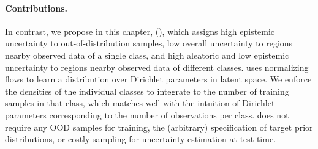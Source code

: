\paragraph{Contributions.} In contrast, we propose  in this chapter, \PostNet (\PostNetacro), which assigns high epistemic uncertainty to out-of-distribution samples, low overall uncertainty to regions nearby observed data of a single class, and high aleatoric and low epistemic uncertainty to regions nearby observed data of different classes. \PostNetacro uses normalizing flows to learn a distribution over Dirichlet parameters in latent space. We enforce the densities of the individual classes to integrate to the number of training samples in that class, which matches well with the intuition of Dirichlet parameters corresponding to the number of observations per class. \PostNetacro does not require any OOD samples for training, the (arbitrary) specification of target prior distributions, or costly sampling for uncertainty estimation at test time.
